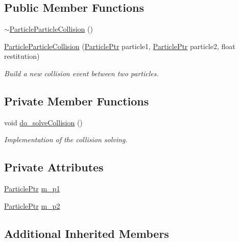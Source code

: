 \subsection*{Public Member Functions}
\begin{DoxyCompactItemize}
\item 
\hyperlink{classParticleParticleCollision_acec460f38329b2347f044ac295f5c47c}{$\sim$\+Particle\+Particle\+Collision} ()
\item 
\hyperlink{classParticleParticleCollision_aef8e68092353ac4843c7cd4626dd60fc}{Particle\+Particle\+Collision} (\hyperlink{Particle_8hpp_a9a7abc8635002993537b61ef2c857fdd}{Particle\+Ptr} particle1, \hyperlink{Particle_8hpp_a9a7abc8635002993537b61ef2c857fdd}{Particle\+Ptr} particle2, float restitution)
\begin{DoxyCompactList}\small\item\em Build a new collision event between two particles. \end{DoxyCompactList}\end{DoxyCompactItemize}
\subsection*{Private Member Functions}
\begin{DoxyCompactItemize}
\item 
void \hyperlink{classParticleParticleCollision_a9f18947965d8615faf1d957c259a65e2}{do\+\_\+solve\+Collision} ()
\begin{DoxyCompactList}\small\item\em Implementation of the collision solving. \end{DoxyCompactList}\end{DoxyCompactItemize}
\subsection*{Private Attributes}
\begin{DoxyCompactItemize}
\item 
\hyperlink{Particle_8hpp_a9a7abc8635002993537b61ef2c857fdd}{Particle\+Ptr} \hyperlink{classParticleParticleCollision_a6ed4f0ca756feef481b59ba27c6f260c}{m\+\_\+p1}
\item 
\hyperlink{Particle_8hpp_a9a7abc8635002993537b61ef2c857fdd}{Particle\+Ptr} \hyperlink{classParticleParticleCollision_a31615486eff94310643ce85e3e40d539}{m\+\_\+p2}
\end{DoxyCompactItemize}
\subsection*{Additional Inherited Members}


